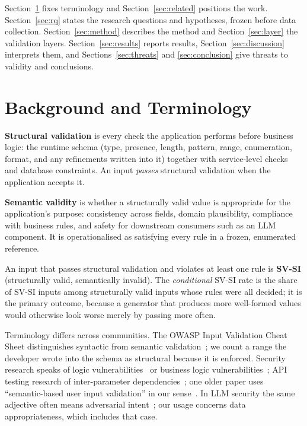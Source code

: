 \documentclass[conference]{IEEEtran}
\begin{document}
Section~\ref{sec:background} fixes terminology and Section~\ref{sec:related} positions the work.
Section~\ref{sec:rq} states the research questions and hypotheses, frozen before data collection.
Section~\ref{sec:method} describes the method and Section~\ref{sec:layer} the validation layers.
Section~\ref{sec:results} reports results, Section~\ref{sec:discussion} interprets them, and
Sections~\ref{sec:threats} and \ref{sec:conclusion} give threats to validity and conclusions.

\section{Background and Terminology}
\label{sec:background}

\textbf{Structural validation} is every check the application performs before business logic: the
runtime schema (type, presence, length, pattern, range, enumeration, format, and any refinements
written into it) together with service-level checks and database constraints. An input
\emph{passes} structural validation when the application accepts it.

\textbf{Semantic validity} is whether a structurally valid value is appropriate for the application's
purpose: consistency across fields, domain plausibility, compliance with business rules, and safety
for downstream consumers such as an LLM component. It is operationalised as satisfying every rule in a
frozen, enumerated reference.

An input that passes structural validation and violates at least one rule is \textbf{SV-SI}
(structurally valid, semantically invalid). The \emph{conditional} SV-SI rate is the share of SV-SI
inputs among structurally valid inputs whose rules were all decided; it is the primary outcome,
because a generator that produces more well-formed values would otherwise look worse merely by
passing more often.

Terminology differs across communities. The OWASP Input Validation Cheat Sheet distinguishes
syntactic from semantic validation~\cite{owasp2026inputvalidation}; we count a range the developer
wrote into the schema as structural because it is enforced. Security research speaks of logic
vulnerabilities~\cite{felmetsger2010waler,pellegrino2014logicflaws} or business logic
vulnerabilities~\cite{metin2025blv}; API testing research of inter-parameter
dependencies~\cite{martinlopez2022idl,martinlopez2019catalogue}; one older paper uses ``semantic-based
user input validation'' in our sense~\cite{hanna2018semanticvalidation}. In LLM security the same
adjective often means adversarial intent~\cite{singh2026injectioninteraction}; our usage concerns data
appropriateness, which includes that case.
\end{document}

